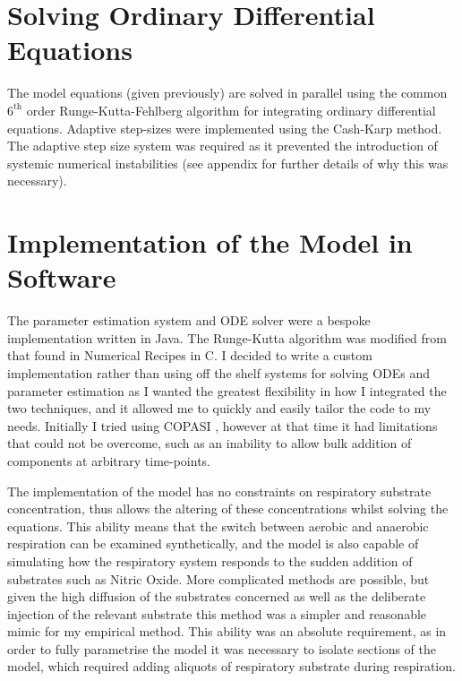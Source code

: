 \section{Solving Ordinary Differential Equations}
The model equations (given previously) are solved in parallel using the common $\mathrm{6}^\mathrm{th}$ order Runge-Kutta-Fehlberg algorithm for integrating ordinary differential equations\cite{Butcher2003}. Adaptive step-sizes were implemented using the Cash-Karp method\cite{Cash1990}. The adaptive step size system was required as it prevented the introduction of systemic numerical instabilities (see appendix for further details of why this was necessary).


\section{Implementation of the Model in Software}
The parameter estimation system and ODE solver were a bespoke implementation written in Java. The Runge-Kutta algorithm was modified from that found in Numerical Recipes in C\cite{Press1992}. I decided to write a custom implementation rather than using off the shelf systems for solving ODEs and parameter estimation as I wanted the greatest flexibility in how I integrated the two techniques, and it allowed me to quickly and easily tailor the code to my needs. Initially I tried using COPASI \cite{Hoops2006}, however at that time it had limitations that could not be overcome, such as an inability to allow bulk addition of components at arbitrary time-points.

The implementation of the model has no constraints on respiratory substrate concentration, thus allows the altering of these concentrations whilst solving the equations. %
This ability means that the switch between aerobic and anaerobic respiration can be examined synthetically, and the model is also capable of simulating how the respiratory system responds to the sudden addition of substrates such as Nitric Oxide. More complicated methods are possible, but given the high diffusion of the substrates concerned as well as the deliberate injection of the relevant substrate this method was a simpler and reasonable mimic for my empirical method. This ability was an absolute requirement, as in order to fully parametrise the model it was necessary to isolate sections of the model, which required adding aliquots of respiratory substrate during respiration.

